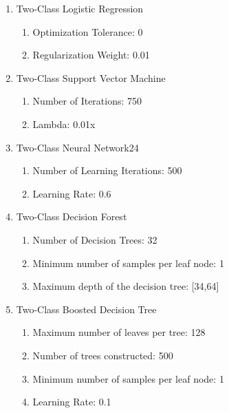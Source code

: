 \begin{enumerate}
    \item{Two-Class Logistic Regression}
    
    \begin{enumerate}
        \item{Optimization Tolerance:} 0
        \item{Regularization Weight:} 0.01
    \end{enumerate}
    
    \item{Two-Class Support Vector Machine}
    
    \begin{enumerate}
        \item{Number of Iterations:} 750
        \item{Lambda:} 0.01x
    \end{enumerate}
    
    \item{Two-Class Neural Network}24
    
    \begin{enumerate}
        \item{Number of Learning Iterations:} 500
        \item{Learning Rate:} 0.6
    \end{enumerate}
    
    \item{Two-Class Decision Forest}

    \begin{enumerate}
        \item{Number of Decision Trees:} 32
        \item{Minimum number of samples per leaf node:} 1
        \item{Maximum depth of the decision tree:} [34,64]
    \end{enumerate}
    
    \item{Two-Class Boosted Decision Tree}
    
    \begin{enumerate}
        \item{Maximum number of leaves per tree:} 128
        \item{Number of trees constructed:} 500
        \item{Minimum number of samples per leaf node:} 1
        \item{Learning Rate:} 0.1
    \end{enumerate}
    
\end{enumerate}

